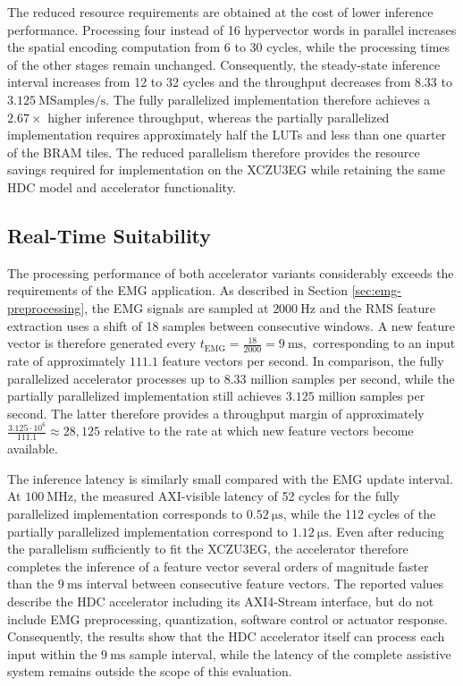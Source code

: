 The reduced resource requirements are obtained at the cost of lower inference performance. Processing four instead of 16 hypervector words in parallel increases the spatial encoding computation from 6 to 30 cycles, while the processing times of the other stages remain unchanged. Consequently, the steady-state inference interval increases from 12 to 32 cycles and the throughput decreases from $8.33$ to $3.125~\mathrm{MSamples/s}$. The fully parallelized implementation therefore achieves a $2.67\times$ higher inference throughput, whereas the partially parallelized implementation requires approximately half the LUTs and less than one quarter of the BRAM tiles. The reduced parallelism therefore provides the resource savings required for implementation on the XCZU3EG while retaining the same HDC model and accelerator functionality.


\subsection{Real-Time Suitability}
\label{sec:FPGA_conclusion}

The processing performance of both accelerator variants considerably exceeds the requirements of the EMG application. As described in Section \ref{sec:emg-preprocessing}, the EMG signals are sampled at $2000~\mathrm{Hz}$ and the RMS feature extraction uses a shift of 18 samples between consecutive windows. A new feature vector is therefore generated every $t_{\mathrm{EMG}}=\frac{18}{2000}=9~\mathrm{ms},$ corresponding to an input rate of approximately $111.1$ feature vectors per second. In comparison, the fully parallelized accelerator processes up to $8.33$ million samples per second, while the partially parallelized implementation still achieves $3.125$ million samples per second. The latter therefore provides a throughput margin of approximately $\frac{3.125 \cdot 10^6}{111.1}\approx28{,}125$ relative to the rate at which new feature vectors become available.

The inference latency is similarly small compared with the EMG update interval. At $100~\mathrm{MHz}$, the measured AXI-visible latency of 52 cycles for the fully parallelized implementation corresponds to $0.52~\mathrm{\mu s}$, while the 112 cycles of the partially parallelized implementation correspond to $1.12~\mathrm{\mu s}$. Even after reducing the parallelism sufficiently to fit the XCZU3EG, the accelerator therefore completes the inference of a feature vector several orders of magnitude faster than the $9~\mathrm{ms}$ interval between consecutive feature vectors. The reported values describe the HDC accelerator including its AXI4-Stream interface, but do not include EMG preprocessing, quantization, software control or actuator response. Consequently, the results show that the HDC accelerator itself can process each input within the $9~\mathrm{ms}$ sample interval, while the latency of the complete assistive system remains outside the scope of this evaluation.
